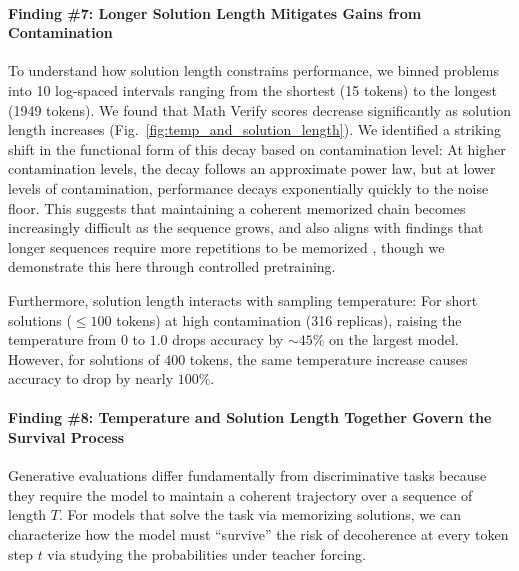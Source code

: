 \paragraph{Finding \#7: Longer Solution Length Mitigates Gains from Contamination} 

To understand how solution length constrains performance, we binned problems into 10 log-spaced intervals ranging from the shortest (15 tokens) to the longest (1949 tokens).
We found that Math Verify scores decrease significantly as solution length increases (Fig.~\ref{fig:temp_and_solution_length}). 
We identified a striking shift in the functional form of this decay based on contamination level:
At higher contamination levels, the decay follows an approximate power law, but at lower levels of contamination, performance decays exponentially quickly to the noise floor.
This suggests that maintaining a coherent memorized chain becomes increasingly difficult as the sequence grows, and also aligns with findings that longer sequences require more repetitions to be memorized \citep{jiang2025a,lu2024scaling}, though we demonstrate this here through controlled pretraining.

Furthermore, solution length interacts with sampling temperature:
For short solutions ($\leq 100$ tokens) at high contamination (316 replicas), raising the temperature from $0$ to $1.0$ drops accuracy by $\sim45\%$ on the largest model. However, for solutions of $400$ tokens, the same temperature increase causes accuracy to drop by nearly $100\%$.


\paragraph{Finding \#8: Temperature and Solution Length Together Govern the Survival Process}

Generative evaluations differ fundamentally from discriminative tasks because they require the model to maintain a coherent trajectory over a sequence of length $T$.
For models that solve the task via memorizing solutions, we can characterize how the model must ``survive'' the risk of decoherence at every token step $t$ via studying the probabilities under teacher forcing.

